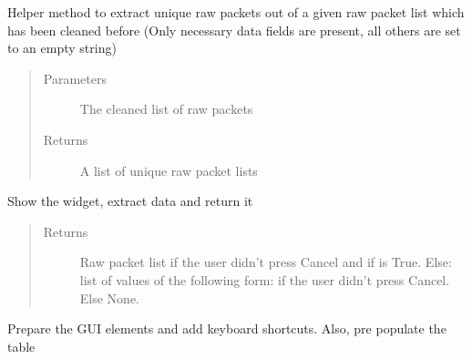 \documentclass[letterpaper,10pt,english]{sphinxmanual}
\begin{document}
\begin{fulllineitems}
\begin{fulllineitems}
\end{fulllineitems}


\begin{fulllineitems}
\label{\detokenize{src:src.PacketsDialog.PacketsDialog.getUniqueRawPackets}}
Helper method to extract unique raw packets out of a given raw packet list
which has been cleaned before (Only necessary data fields are present, all others are
set to an empty string)
\begin{quote}\begin{description}
\item[{Parameters}] \leavevmode
{} \textendash{} The cleaned list of raw packets

\item[{Returns}] \leavevmode
A list of unique raw packet lists

\end{description}\end{quote}

\end{fulllineitems}


\begin{fulllineitems}
\label{\detokenize{src:src.PacketsDialog.PacketsDialog.open}}
Show the widget, extract data and return it
\begin{quote}\begin{description}
\item[{Returns}] \leavevmode
Raw packet list if the user didn’t press Cancel and if  is True.
Else: list of values of the following form:  if the user didn’t press Cancel.
Else None.

\end{description}\end{quote}

\end{fulllineitems}


\begin{fulllineitems}
\label{\detokenize{src:src.PacketsDialog.PacketsDialog.prepareUI}}
Prepare the GUI elements and add keyboard shortcuts. Also, pre populate the table

\end{fulllineitems}


\end{fulllineitems}
\end{document}
